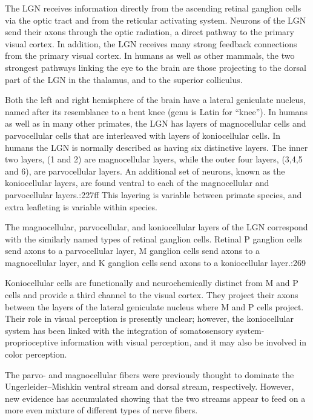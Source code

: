 \documentclass[]{book}
\begin{document}
The LGN receives information directly from the ascending retinal ganglion cells via the optic tract and from the reticular activating system. Neurons of the LGN send their axons through the optic radiation, a direct pathway to the primary visual cortex. In addition, the LGN receives many strong feedback connections from the primary visual cortex. In humans as well as other mammals, the two strongest pathways linking the eye to the brain are those projecting to the dorsal part of the LGN in the thalamus, and to the superior colliculus.

Both the left and right hemisphere of the brain have a lateral geniculate nucleus, named after its resemblance to a bent knee (genu is Latin for ``knee''). In humans as well as in many other primates, the LGN has layers of magnocellular cells and parvocellular cells that are interleaved with layers of koniocellular cells. In humans the LGN is normally described as having six distinctive layers. The inner two layers, (1 and 2) are magnocellular layers, while the outer four layers, (3,4,5 and 6), are parvocellular layers. An additional set of neurons, known as the koniocellular layers, are found ventral to each of the magnocellular and parvocellular layers.:227ff This layering is variable between primate species, and extra leafleting is variable within species.

The magnocellular, parvocellular, and koniocellular layers of the LGN correspond with the similarly named types of retinal ganglion cells. Retinal P ganglion cells send axons to a parvocellular layer, M ganglion cells send axons to a magnocellular layer, and K ganglion cells send axons to a koniocellular layer.:269

Koniocellular cells are functionally and neurochemically distinct from M and P cells and provide a third channel to the visual cortex. They project their axons between the layers of the lateral geniculate nucleus where M and P cells project. Their role in visual perception is presently unclear; however, the koniocellular system has been linked with the integration of somatosensory system-proprioceptive information with visual perception, and it may also be involved in color perception.

The parvo- and magnocellular fibers were previously thought to dominate the Ungerleider--Mishkin ventral stream and dorsal stream, respectively. However, new evidence has accumulated showing that the two streams appear to feed on a more even mixture of different types of nerve fibers.
\end{document}
